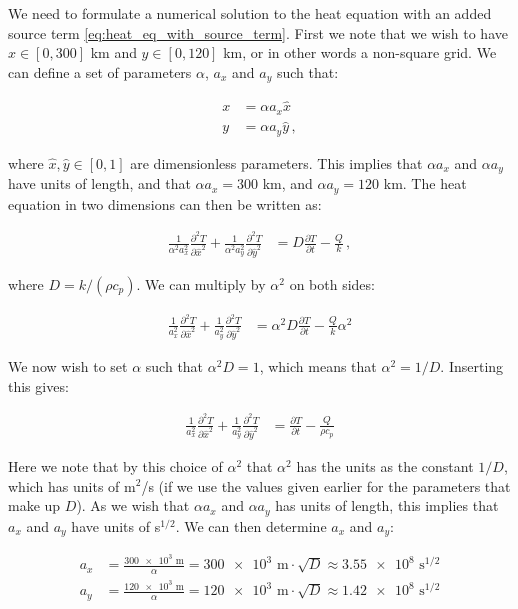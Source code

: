 \documentclass[reprint,english,notitlepage]{revtex4-1}  %
\begin{document}
We need to formulate a numerical solution to the heat equation with an added source term \eqref{eq:heat_eq_with_source_term}. First we note that we wish to have $x \in [0,300]$ km and $y \in [0,120]$ km, or in other words a non-square grid. We can define a set of parameters $\alpha$, $a_x$ and $a_y$ such that:

\begin{align*}
x &= \alpha a_x \hat{x} \\
y &= \alpha a_y \hat{y} \, ,
\end{align*}

where $\hat{x},\hat{y} \in [0,1]$ are dimensionless parameters. This implies that $\alpha a_x$ and $\alpha a_y$ have units of length, and that $\alpha a_x = 300$ km, and $\alpha a_y = 120$ km. The heat equation in two dimensions can then be written as:

\begin{align*}
\frac{1}{\alpha^2 a_x^2}\frac{\partial^2 T}{\partial \hat{x}^2} + \frac{1}{\alpha^2 a_y^2} \frac{\partial^2 T}{\partial \hat{y}^2} &= D\frac{\partial T}{\partial t} - \frac{Q}{k} \, ,
\end{align*} 

where $D = k/(\rho c_p)$. We can multiply by $\alpha^2$ on both sides:

\begin{align*}
\frac{1}{a_x^2}\frac{\partial^2 T}{\partial \hat{x}^2} + \frac{1}{a_y^2} \frac{\partial^2 T}{\partial \hat{y}^2} &= \alpha^2 D \frac{\partial T}{\partial t} - \frac{Q}{k}\alpha^2 
\end{align*}

We now wish to set $\alpha$ such that $\alpha^2 D = 1$, which means that $\alpha^2 = 1/D$. Inserting this gives:

\begin{align*}
\frac{1}{a_x^2} \frac{\partial^2 T}{\partial \hat{x}^2} + \frac{1}{a_y^2} \frac{\partial^2 T}{\partial \hat{y}^2} &=  \frac{\partial T}{\partial t} - \frac{Q}{\rho c_p}
\end{align*}

Here we note that by this choice of $\alpha^2 $ that $\alpha^2$ has the units as the constant $1/D$, which has units of m$^2$/s (if we use the values given earlier for the parameters that make up $D$). As we wish that $\alpha a_x$ and $\alpha a_y$ has units of length, this implies that $a_x$ and $a_y$ have units of s$^{1/2}$. We can then determine $a_x$ and $a_y$:

\begin{align*}
a_x &= \frac{\num{300e3} \text{ m}}{\alpha} = \num{300e3}\text{ m} \cdot \sqrt{D} \approx \num{3.55e8} \text{ s}^{1/2} \\
a_y &= \frac{\num{120e3} \text{ m}}{\alpha} = \num{120e3}\text{ m} \cdot \sqrt{D} \approx \num{1.42e8} \text{ s}^{1/2}
\end{align*}
\end{document}
